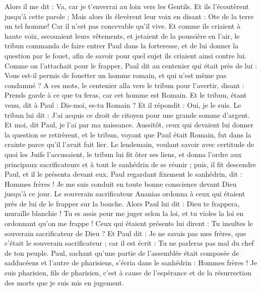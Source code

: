 \begin{multicols}{2}
{{{Alors il me dit : Va, car je t'enverrai au loin vers les Gentils.
Et ils l'écoutèrent jusqu'à cette parole ; Mais alors ils élevèrent leur voix en disant : Ote de la terre un tel homme! Car il n'est pas concevable qu'il vive.
Et comme ils criaient à haute voix, secouaient leurs vêtements, et jetaient de la poussière en l'air,
le tribun commanda de faire entrer Paul dans la forteresse, et de lui donner la question par le fouet, afin de savoir pour quel sujet ils criaient ainsi contre lui.
Comme on l'attachait pour le frapper, Paul dit au centenier qui était près de lui : Vous est-il permis de fouetter un homme romain, et qui n'est même pas condamné ?
A ces mots, le centenier alla vers le tribun pour l'avertir, disant : Prends garde à ce que tu feras, car cet homme est Romain.
Et le tribun, étant venu, dit à Paul : Dis-moi, es-tu Romain ? Et il répondit : Oui, je le suis.
Le tribun lui dit : J'ai acquis ce droit de citoyen pour une grande somme d'argent. Et moi, dit Paul, je l'ai par ma naissance.
Aussitôt, ceux qui devaient lui donner la question se retirèrent, et le tribun, voyant que Paul était Romain, fut dans la crainte parce qu'il l'avait fait lier.
Le lendemain, voulant savoir avec certitude de quoi les Juifs l'accusaient, le tribun lui fit ôter ses liens, et donna l'ordre aux principaux sacrificateurs et à tout le sanhédrin de se réunir ; puis, il fit descendre Paul, et il le présenta devant eux.
\VerseOne{}Paul regardant fixement le sanhédrin, dit : Hommes frères ! Je me suis conduit en toute bonne conscience devant Dieu jusqu'à ce jour.
Le souverain sacrificateur Ananias ordonna à ceux qui étaient près de lui de le frapper sur la bouche.
Alors Paul lui dit : Dieu te frappera, muraille blanchie ! Tu es assis pour me juger selon la loi, et tu violes la loi en ordonnant qu'on me frappe !
Ceux qui étaient présents lui dirent : Tu insultes le souverain sacrificateur de Dieu ?
Et Paul dit : Je ne savais pas mes frères, que c'était le souverain sacrificateur ; car il est écrit : Tu ne parleras pas mal du chef de ton peuple.
Paul, sachant qu'une partie de l'assemblée était composée de sadducéens et l'autre de pharisiens, s'écria dans le sanhédrin : Hommes frères ! Je suis pharisien, fils de pharisien, c'est à cause de l'espérance et de la résurrection des morts que je suis mis en jugement.
}}}
\end{multicols}
